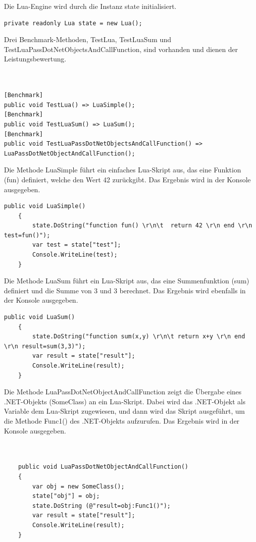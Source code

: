 Die Lua-Engine wird durch die Instanz state initialisiert. 
\begin{lstlisting}[language={[Sharp]C}, caption=NLuaState, label=lst:imp:nLuaState]
    private readonly Lua state = new Lua();
\end{lstlisting}


Drei Benchmark-Methoden, TestLua, TestLuaSum und TestLuaPassDotNetObjectsAndCallFunction, sind vorhanden und dienen der Leistungsbewertung.

\begin{lstlisting}[language={[Sharp]C}, caption=NLuaBenchmark, label=lst:imp:NLuaBenchmark]

  
[Benchmark]
public void TestLua() => LuaSimple();
[Benchmark]
public void TestLuaSum() => LuaSum();
[Benchmark]
public void TestLuaPassDotNetObjectsAndCallFunction() => LuaPassDotNetObjectAndCallFunction();        
\end{lstlisting}
Die Methode LuaSimple führt ein einfaches Lua-Skript aus, das eine Funktion (fun) definiert, welche den Wert 42 zurückgibt. Das Ergebnis wird in der Konsole ausgegeben.
\begin{lstlisting}[language={[Sharp]C}, caption=NLuaSimple, label=lst:imp:NLuaSimple]
    public void LuaSimple()
    {
        state.DoString("function fun() \r\n\t  return 42 \r\n end \r\n test=fun()");
        var test = state["test"];
        Console.WriteLine(test);
    }
\end{lstlisting}
Die Methode LuaSum führt ein Lua-Skript aus, das eine Summenfunktion (sum) definiert und die Summe von 3 und 3 berechnet. Das Ergebnis wird ebenfalls in der Konsole ausgegeben.
\begin{lstlisting}[language={[Sharp]C}, caption=NLuaSum, label=lst:imp:NLuaSum]
    public void LuaSum()
    {
        state.DoString("function sum(x,y) \r\n\t return x+y \r\n end \r\n result=sum(3,3)");
        var result = state["result"];
        Console.WriteLine(result);
    }
\end{lstlisting}

Die Methode LuaPassDotNetObjectAndCallFunction zeigt die Übergabe eines .NET-Objekts (SomeClass) an ein Lua-Skript. Dabei wird das .NET-Objekt als Variable dem Lua-Skript zugewiesen, und dann wird das Skript ausgeführt, um die Methode Func1() des .NET-Objekts aufzurufen. Das Ergebnis wird in der Konsole ausgegeben.

\begin{lstlisting}[language={[Sharp]C}, caption=NLuaPassObjects, label=lst:imp:nluaPassObj]

    
    public void LuaPassDotNetObjectAndCallFunction()
    {
        var obj = new SomeClass();
        state["obj"] = obj;
        state.DoString (@"result=obj:Func1()");
        var result = state["result"];
        Console.WriteLine(result);
    }

\end{lstlisting}


